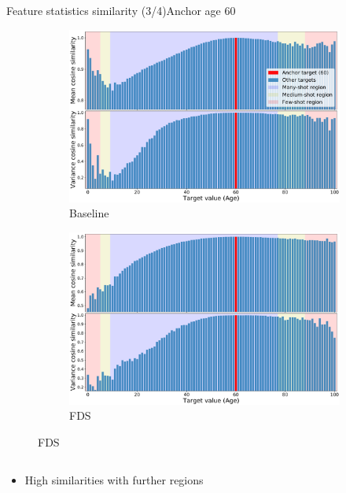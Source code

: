 \begin{frame}{Feature statistics similarity (3/4)}{Anchor age 60}
	\begin{figure}[h]
		\begin{subfigure}{0.48\textwidth}
			\includegraphics[width=\linewidth]{images/feat_sim_fds_base_60.pdf}
			\caption{Baseline}
		\end{subfigure}\hspace{1em}%
		\begin{subfigure}{0.48\textwidth}
			\includegraphics[width=\linewidth]{images/feat_sim_fds_ours_60.pdf}
			\caption{FDS}
		\end{subfigure}
	\end{figure}
	\vspace{-1em}
	\begin{columns}
		\footnotesize
		\begin{column}{0.5\textwidth}
			\begin{itemize}
				\item High similarities with further regions

\end{itemize}
\end{column}
\end{columns}
\end{frame}
